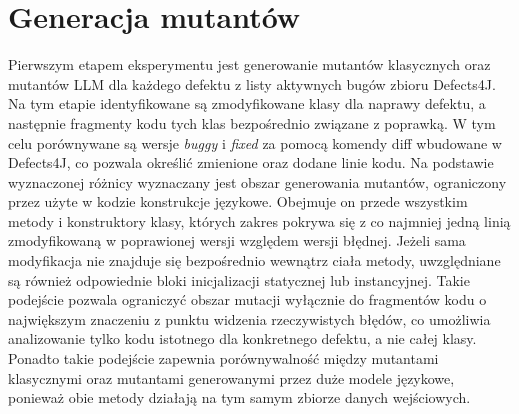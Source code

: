 \documentclass[12pt,a4paper,oldfontcommands]{memoir}
\theoremstyle{plain}
\theoremstyle{definition}
\theoremstyle{remark}
\begin{document}
    \section{Generacja mutantów}

    Pierwszym etapem eksperymentu jest generowanie mutantów klasycznych oraz mutantów LLM dla każdego defektu z listy aktywnych bugów zbioru Defects4J.
    Na tym etapie identyfikowane są zmodyfikowane klasy dla naprawy defektu, a następnie fragmenty kodu tych klas bezpośrednio związane z poprawką.
    W tym celu porównywane są wersje \textit{buggy} i \textit{fixed} za pomocą komendy diff wbudowane w Defects4J, co pozwala określić zmienione oraz dodane linie kodu.
    Na podstawie wyznaczonej różnicy wyznaczany jest obszar generowania mutantów, ograniczony przez użyte w kodzie konstrukcje językowe.
    Obejmuje on przede wszystkim metody i konstruktory klasy, których zakres pokrywa się z co najmniej jedną linią zmodyfikowaną w poprawionej wersji względem wersji błędnej.
    Jeżeli sama modyfikacja nie znajduje się bezpośrednio wewnątrz ciała metody, uwzględniane są również odpowiednie bloki inicjalizacji statycznej lub instancyjnej.
    Takie podejście pozwala ograniczyć obszar mutacji wyłącznie do fragmentów kodu o największym znaczeniu z punktu widzenia rzeczywistych błędów, co umożliwia analizowanie tylko kodu istotnego dla konkretnego defektu, a nie całej klasy.
    Ponadto takie podejście zapewnia porównywalność między mutantami klasycznymi oraz mutantami generowanymi przez duże modele językowe, ponieważ obie metody działają na tym samym zbiorze danych wejściowych.
\end{document}
